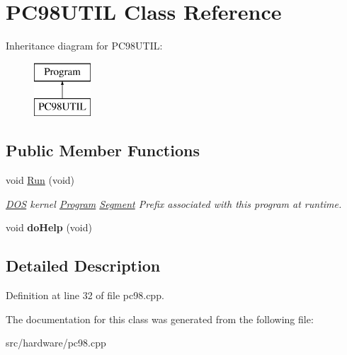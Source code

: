 \hypertarget{classPC98UTIL}{\section{P\-C98\-U\-T\-I\-L Class Reference}
\label{classPC98UTIL}
}
Inheritance diagram for P\-C98\-U\-T\-I\-L\-:\begin{figure}[H]
\begin{center}
\leavevmode
\includegraphics[height=2.000000cm]{classPC98UTIL}
\end{center}
\end{figure}
\subsection*{Public Member Functions}
\begin{DoxyCompactItemize}
\item 
\hypertarget{classPC98UTIL_a707ed1ec88edc877739dc492b9b2d752}{void \hyperlink{classPC98UTIL_a707ed1ec88edc877739dc492b9b2d752}{Run} (void)}\label{classPC98UTIL_a707ed1ec88edc877739dc492b9b2d752}

\begin{DoxyCompactList}\small\item\em \hyperlink{classDOS}{D\-O\-S} kernel \hyperlink{classProgram}{Program} \hyperlink{structSegment}{Segment} Prefix associated with this program at runtime. \end{DoxyCompactList}\item 
\hypertarget{classPC98UTIL_acfb7033342820a8d47b88310b7c4a27d}{void {\bfseries do\-Help} (void)}\label{classPC98UTIL_acfb7033342820a8d47b88310b7c4a27d}

\end{DoxyCompactItemize}


\subsection{Detailed Description}


Definition at line 32 of file pc98.\-cpp.



The documentation for this class was generated from the following file\-:\begin{DoxyCompactItemize}
\item 
src/hardware/pc98.\-cpp\end{DoxyCompactItemize}
